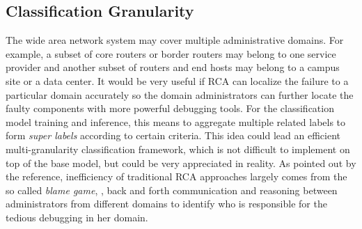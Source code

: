 \subsection{Classification Granularity} 
\label{sub:ml:granularity}
The wide area network system may cover multiple administrative domains. For example, a subset of core routers or border routers may belong to one service provider and another subset of routers and end hosts may belong to a campus site or a data center. It would be very useful if RCA can localize the failure to a particular domain accurately so the domain administrators can further locate the faulty components with more powerful debugging tools. For the classification model training and inference, this means to aggregate multiple related labels to form {\it super labels} according to certain criteria. This idea could lead an efficient multi-granularity classification framework, which is not difficult to implement on top of the base model, but could be very appreciated in reality. As pointed out by the reference, inefficiency of traditional RCA approaches largely comes from the so called {\it blame game}, \ie, back and forth communication and reasoning between administrators from different domains to identify who is responsible for the tedious debugging in her domain. 





